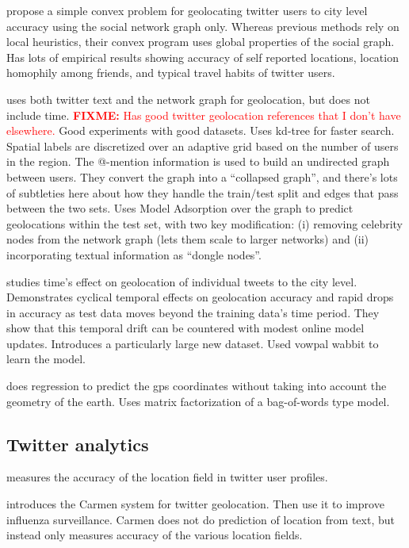 \documentclass[sigconf,10pt]{acmart}
\newcommand{\fixme}[1]{\textcolor{red}{\textbf{FIXME:} {#1}}}
\begin{document}
\citet{compton2014geotagging} propose a simple convex problem for geolocating twitter users to city level accuracy using the social network graph only.
Whereas previous methods rely on local heuristics, their convex program uses global properties of the social graph.
Has lots of empirical results showing accuracy of self reported locations, location homophily among friends, and typical travel habits of twitter users.

\citet{rahimi2015twitter} uses both twitter text and the network graph for geolocation, but does not include time.
\fixme{Has good twitter geolocation references that I don't have elsewhere.}
Good experiments with good datasets.
Uses kd-tree for faster search.
Spatial labels are discretized over an adaptive grid based on the number of users in the region.
The @-mention information is used to build an undirected graph between users.
They convert the graph into a ``collapsed graph'', and there's lots of subtleties here about how they handle the train/test split and edges that pass between the two sets.
Uses Model Adsorption over the graph to predict geolocations within the test set, 
with two key modification:
(i) removing celebrity nodes from the network graph (lets them scale to larger networks)
and (ii) incorporating textual information as ``dongle nodes''.

\citet{dredze2016geolocation} studies time's effect on geolocation of individual tweets to the city level.
Demonstrates cyclical temporal effects on geolocation accuracy and rapid drops in accuracy as test data moves beyond the training data's time period.
They show that this temporal drift can be countered with modest online model updates.
Introduces a particularly large new dataset.
Used vowpal wabbit to learn the model.

\citet{duong2016near} does regression to predict the gps coordinates without taking into account the geometry of the earth.
Uses matrix factorization of a bag-of-words type model.


\subsection{Twitter analytics}

\citet{hecht2011tweets} measures the accuracy of the location field in twitter user profiles.

\citet{dredze2013carmen} introduces the Carmen system for twitter geolocation.
Then use it to improve influenza surveillance.
Carmen does not do prediction of location from text,
but instead only measures accuracy of the various location fields.
\end{document}

